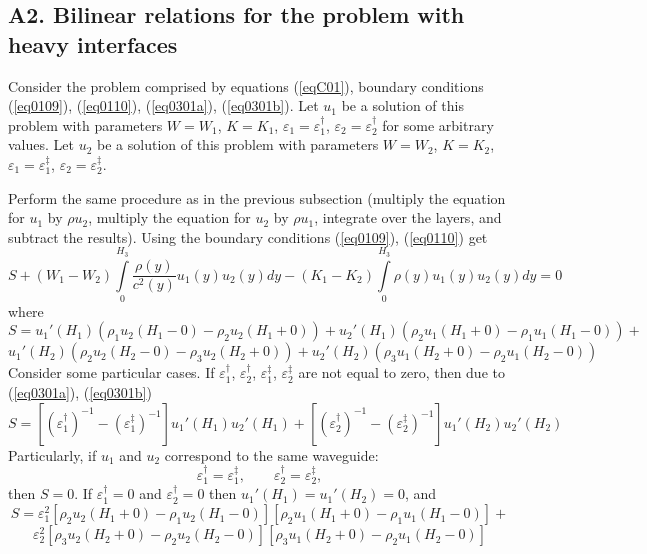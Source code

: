 \documentclass[12pt]{article}
\newcommand{\eps}{\varepsilon}
\begin{document}
\subsection*{A2. Bilinear relations for the problem with heavy interfaces}

Consider the problem comprised by equations (\ref{eqC01}), 
boundary conditions (\ref{eq0109}), (\ref{eq0110}), (\ref{eq0301a}), 
(\ref{eq0301b}). 
Let $u_1$ be a solution of this problem with parameters $W = W_1$, 
$K = K_1$, $\eps_1 = \eps_1^\dag$, $\eps_2 = \eps_2^\dag$  
for some arbitrary values. 
Let $u_2$ be a solution of this problem with parameters $W = W_2$, 
$K = K_2$, $\eps_1 = \eps_1^\ddag$, $\eps_2 = \eps_2^\ddag$.

Perform the same procedure as in the previous subsection (multiply the equation for 
$u_1$ by $\rho u_2$, multiply the equation for $u_2$ by $\rho u_1$, integrate over the layers,
and subtract the results). Using the boundary conditions 
(\ref{eq0109}), (\ref{eq0110}) get 
\begin{equation}
S +(W_1 - W_2) \int \limits_0^{H_3} \frac{\rho(y)}{c^2(y)} u_1(y) u_2(y) dy - 
(K_1 - K_2) \int \limits_0^{H_3} \rho(y) u_1(y) u_2(y) dy = 0 
\label{eqC04}
\end{equation} 
where 
\[
S = 
u_1'(H_1) (\rho_1 u_2(H_1-0) - \rho_2 u_2(H_1+0)) 
+
u_2'(H_1) (\rho_2 u_1(H_1+0) - \rho_1 u_1(H_1-0))
+
\]
\begin{equation}
u_1'(H_2) (\rho_2 u_2(H_2-0) - \rho_3 u_2(H_2+0)) 
+
u_2'(H_2) (\rho_3 u_1(H_2+0) - \rho_2 u_1(H_2-0))
\label{eqC05}
\end{equation} 
Consider some particular cases.
If $\eps_1^\dag$, $\eps_2^\dag$, $\eps_1^\ddag$, $\eps_2^\ddag$ are not equal to zero, then 
due to (\ref{eq0301a}), (\ref{eq0301b})   
\begin{equation}
S = 
[(\eps_1^\dag)^{-1} - (\eps_1^\ddag)^{-1}] u_1'(H_1) u_2'(H_1) 
+
[(\eps_2^\dag)^{-1} - (\eps_2^\ddag)^{-1}] u_1'(H_2) u_2'(H_2) 
\label{eqC06}
\end{equation}
Particularly, if $u_1$ and $u_2$ correspond to the same waveguide:
\[
\eps_1^\dag = \eps_1^\ddag , 
\qquad 
\eps_2^\dag = \eps_2^\ddag ,
\]
then $S = 0$. If $\eps_1^\dag = 0$ and $\eps_2^\dag =0 $ then 
$u_1' (H_1) = u_1'(H_2) =0$, and 
\[
S = 
\eps_1^2 [\rho_2 u_2(H_1+0) - \rho_1 u_2(H_1-0)]
[\rho_2 u_1(H_1+0) - \rho_1 u_1(H_1-0)]
+
\]
\begin{equation}
\eps_2^2
[\rho_3 u_2(H_2+0) - \rho_2 u_2(H_2-0)]
[\rho_3 u_1(H_2+0) - \rho_2 u_1(H_2-0)]
\label{eqC07}
\end{equation}
\end{document}
